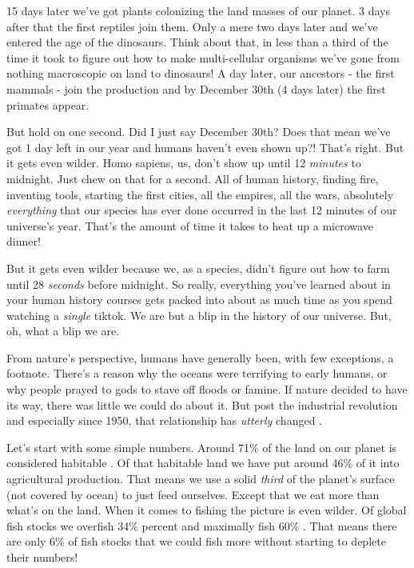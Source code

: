 \documentclass[11pt]{book}
\begin{document}
15 days later we've got plants colonizing the land masses of our planet. 3 days after that the first reptiles join them. Only a mere two days later and we've entered the age of the dinosaurs. Think about that, in less than a third of the time it took to figure out how to make multi-cellular organisms we've gone from nothing macroscopic on land to dinosaurs! A day later, our ancestors - the first mammals - join the production and by December 30th (4 days later) the first primates appear. 

But hold on one second. Did I just say December 30th? Does that mean we've got 1 day left in our year and humans haven't even shown up?! That's right. But it gets even wilder. Homo sapiens, us, don't show up until 12 \textit{minutes} to midnight. Just chew on that for a second. All of human history, finding fire, inventing tools, starting the first cities, all the empires, all the wars, absolutely \textit{everything} that our species has ever done occurred in the last 12 minutes of our universe's year. That's the amount of time it takes to heat up a microwave dinner!

But it gets even wilder because we, as a species, didn't figure out how to farm until 28 \textit{seconds} before midnight. So really, everything you've learned about in your human history courses gets packed into about as much time as you spend watching a \textit{single} tiktok. We are but a blip in the history of our universe. But, oh, what a blip we are. 
\newline

From nature's perspective, humans have generally been, with few exceptions, a footnote. There's a reason why the oceans were terrifying to early humans, or why people prayed to gods to stave off floods or famine. If nature decided to have its way, there was little we could do about it. But post the industrial revolution and especially since 1950, that relationship has \textit{utterly} changed \cite{eellis}.

Let's start with some simple numbers. Around 71\% of the land on our planet is considered habitable \cite{hritchie}. Of that habitable land we have put around 46\% of it into agricultural production. That means we use a solid \textit{third} of the planet's surface (not covered by ocean) to just feed ourselves. Except that we eat more than what's on the land. When it comes to fishing the picture is even wilder. Of global fish stocks we overfish 34\% percent and maximally fish 60\% \cite{mroser}. That means there are only 6\% of fish stocks that we could fish more without starting to deplete their numbers!
\end{document}
